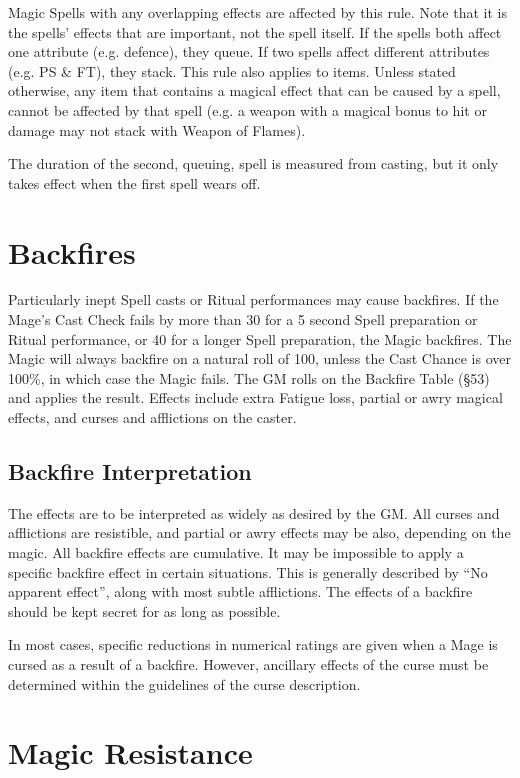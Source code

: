 \begin{Chapter}{Magic}
Spells with any overlapping effects are affected by this rule.  Note
that it is the spells’ effects that are important, not the spell
itself.  If the spells both affect one attribute (e.g.  defence), they
queue.  If two spells affect different attributes (e.g. PS \& FT),
they stack.  This rule also applies to items.  Unless stated
otherwise, any item that contains a magical effect that can be caused
by a spell, cannot be affected by that spell (e.g. a weapon with a
magical bonus to hit or damage may not stack with Weapon of Flames).

The duration of the second, queuing, spell is measured from casting,
but it only takes effect when the first spell wears off.


\section{Backfires}

Particularly inept Spell casts or Ritual performances may cause
backfires.  If the Mage’s Cast Check fails by more than 30 for a 5
second Spell preparation or Ritual performance, or 40 for a longer
Spell preparation, the Magic backfires. The Magic will always backfire
on a natural roll of 100, unless the Cast Chance is over 100\%, in
which case the Magic fails. The GM rolls on the Backfire Table (§53)
and applies the result.  Effects include extra Fatigue loss, partial
or awry magical effects, and curses and afflictions on the caster.

\subsection{Backfire Interpretation}

The effects are to be interpreted as widely as desired by the GM.  All
curses and afflictions are resistible, and partial or awry effects may
be also, depending on the magic.  All backfire effects are cumulative.
It may be impossible to apply a specific backfire effect in certain
situations.  This is generally described by “No apparent effect”,
along with most subtle afflictions. The effects of a backfire should
be kept secret for as long as possible.

In most cases, specific reductions in numerical ratings are given when
a Mage is cursed as a result of a backfire.  However, ancillary
effects of the curse must be determined within the guidelines of the
curse description.


\section{Magic Resistance}


\end{Chapter}
